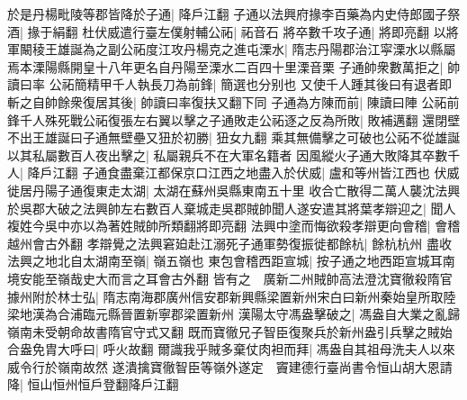 於是丹楊毗陵等郡皆降於子通|{
	降戶江翻}
子通以法興府掾李百藥為内史侍郎國子祭酒|{
	掾于絹翻}
杜伏威遣行臺左僕射輔公祏|{
	祏音石}
將卒數千攻子通|{
	將即亮翻}
以將軍闞稜王雄誕為之副公祏度江攻丹楊克之進屯溧水|{
	隋志丹陽郡治江寜溧水以縣屬焉本溧陽縣開皇十八年更名自丹陽至溧水二百四十里溧音栗}
子通帥衆數萬拒之|{
	帥讀曰率}
公祏簡精甲千人執長刀為前鋒|{
	簡選也分别也}
又使千人踵其後曰有退者即斬之自帥餘衆復居其後|{
	帥讀曰率復扶又翻下同}
子通為方陳而前|{
	陳讀曰陣}
公祏前鋒千人殊死戰公祏復張左右翼以擊之子通敗走公祏逐之反為所敗|{
	敗補邁翻}
還閉壁不出王雄誕曰子通無壁壘又狃於初勝|{
	狃女九翻}
乘其無備擊之可破也公祏不從雄誕以其私屬數百人夜出擊之|{
	私屬親兵不在大軍名籍者}
因風縱火子通大敗降其卒數千人|{
	降戶江翻}
子通食盡棄江都保京口江西之地盡入於伏威|{
	盧和等州皆江西也}
伏威徙居丹陽子通復東走太湖|{
	太湖在蘇州吳縣東南五十里}
收合亡散得二萬人襲沈法興於吳郡大破之法興帥左右數百人棄城走吳郡賊帥聞人遂安遣其將葉孝辯迎之|{
	聞人複姓今吳中亦以為著姓賊帥所類翻將即亮翻}
法興中塗而悔欲殺孝辯更向會稽|{
	會稽越州會古外翻}
孝辯覺之法興窘廹赴江溺死子通軍勢復振徙都餘杭|{
	餘杭杭州}
盡收法興之地北自太湖南至嶺|{
	嶺五嶺也}
東包會稽西距宣城|{
	按子通之地西距宣城耳南境安能至嶺哉史大而言之耳會古外翻}
皆有之　廣新二州賊帥高法澄沈寶徹殺隋官據州附於林士弘|{
	隋志南海郡廣州信安郡新興縣梁置新州宋白曰新州秦始皇所取陸梁地漢為合浦臨元縣晉置新寧郡梁置新州}
漢陽太守馮盎擊破之|{
	馮盎自大業之亂歸嶺南未受朝命故書隋官守式又翻}
既而寶徹兄子智臣復聚兵於新州盎引兵擊之賊始合盎免胄大呼曰|{
	呼火故翻}
爾識我乎賊多棄仗肉袒而拜|{
	馮盎自其祖母洗夫人以來威令行於嶺南故然}
遂潰擒寶徹智臣等嶺外遂定　竇建德行臺尚書令恒山胡大恩請降|{
	恒山恒州恒戶登翻降戶江翻}


